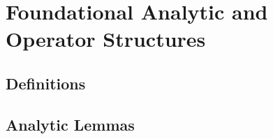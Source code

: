 \section{Foundational Analytic and Operator Structures}
\label{sec:foundations}




\subsection{Definitions}











\subsection{Analytic Lemmas}
















